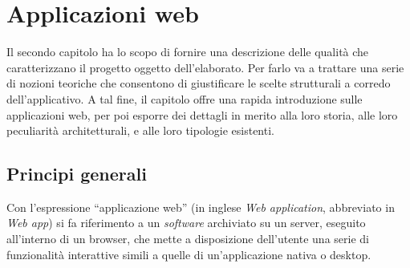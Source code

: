 
\chapter{Applicazioni web}
Il secondo capitolo ha lo scopo di fornire una descrizione delle qualità che caratterizzano il progetto oggetto dell'elaborato. Per farlo va a trattare una serie di nozioni teoriche che consentono di giustificare le scelte strutturali a corredo dell'applicativo. A tal fine, il capitolo offre una rapida introduzione sulle applicazioni web, per poi esporre dei dettagli in merito alla loro storia, alle loro peculiarità architetturali, e alle loro tipologie esistenti.

\section{Principi generali}
\label{sec:Principi generali}
Con l'espressione “applicazione web” (in inglese \textit{Web application}, abbreviato in \textit{Web app}) si fa riferimento a un \textit{software} archiviato su un server, eseguito all'interno di un browser, che mette a disposizione dell'utente una serie di funzionalità interattive simili a quelle di un'applicazione nativa o desktop. 

